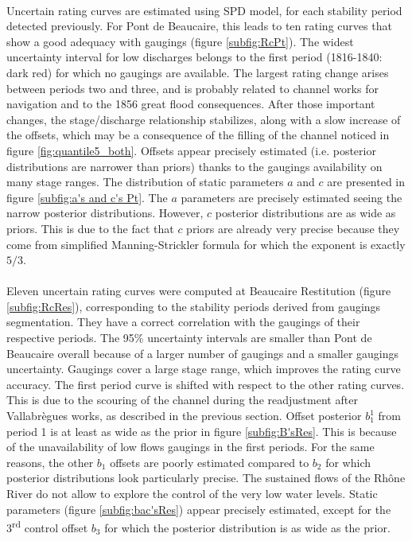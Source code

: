 \documentclass[11pt]{article}
\begin{document}
    \paragraph{}
    Uncertain rating curves are estimated using \citet{mansanarez_shift_2019} SPD model, for each stability period detected previously. For Pont de Beaucaire, this leads to ten rating curves that show a good adequacy with gaugings (figure \ref{subfig:RcPt}). The widest uncertainty interval for low discharges belongs to the first period (1816-1840: dark red) for which no gaugings are available. The largest rating change arises between periods two and three, and is probably related to channel works for navigation and to the 1856 great flood consequences. After those important changes, the stage/discharge relationship stabilizes, along with a slow increase of the offsets, which may be a consequence of the filling of the channel noticed in figure \ref{fig:quantile5_both}. Offsets appear precisely estimated (i.e. posterior distributions are narrower than priors) thanks to the gaugings availability on many stage ranges. The distribution of static parameters $a$ and $c$ are presented in figure \ref{subfig:a's and c's Pt}. The $a$ parameters are precisely estimated seeing the narrow posterior distributions. However, $c$ posterior distributions are as wide as priors. This is due to the fact that $c$ priors are already very precise because they come from simplified Manning-Strickler formula for which the exponent is exactly $5/3$.
    
    \paragraph{}
    Eleven uncertain rating curves were computed at Beaucaire Restitution (figure \ref{subfig:RcRes}), corresponding to the stability periods derived from gaugings segmentation. They have a correct correlation with the gaugings of their respective periods. The 95\% uncertainty intervals are smaller than Pont de Beaucaire overall because of a larger number of gaugings and a smaller gaugings uncertainty. Gaugings cover a large stage range, which improves the rating curve accuracy. The first period curve is shifted with respect to the other rating curves. This is due to the scouring of the channel during the readjustment after Vallabrègues works, as described in the previous section. Offset posterior $b_1^1$ from period 1 is at least as wide as the prior in figure \ref{subfig:B'sRes}. This is because of the unavailability of low flows gaugings in the first periods. For the same reasons, the other $b_1$ offsets are poorly estimated compared to $b_2$ for which posterior distributions look particularly precise. The sustained flows of the Rhône River do not allow to explore the control of the very low water levels. Static parameters (figure \ref{subfig:bac'sRes}) appear precisely estimated, except for the 3\textsuperscript{rd} control offset $b_3$ for which the posterior distribution is as wide as the prior. 
    
\end{document}
